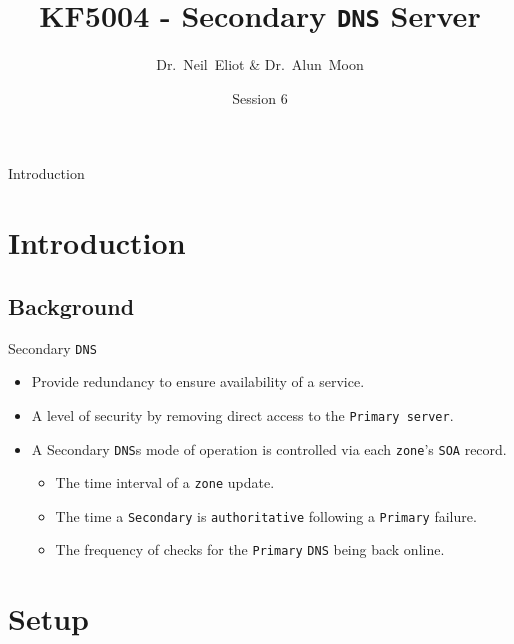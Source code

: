 \documentclass[xcolor=table]{beamer}
\title{KF5004 - Secondary \texttt{DNS} Server}
\author{Dr.~Neil~Eliot \& Dr.~Alun~Moon}
\institute[Northumbria University] %
{
  Department of Computer and Information Sciences\\
  University of Northumbria
}
\date{Session 6}
\begin{document}
\begin{frame}
  \titlepage
\end{frame}

\begin{frame}{Introduction}
  \tableofcontents
\end{frame}


\section{Introduction}
\subsection{Background}
\begin{frame}{Secondary \texttt{DNS}}
  \begin{itemize}
    \item Provide redundancy to ensure availability of a service.
    \item A level of security by removing direct access to the \texttt{Primary server}.
    \item A Secondary \texttt{DNS}s mode of operation is controlled via each \texttt{zone}’s \texttt{SOA} record.
      \begin{itemize}
        \item The time interval of a \texttt{zone} update.
        \item The time a \texttt{Secondary} is \texttt{authoritative} following a \texttt{Primary} failure.
        \item The frequency of checks for the \texttt{Primary} \texttt{DNS} being back online.
      \end{itemize}
  \end{itemize}
\end{frame}

\section{Setup}
\end{document}
